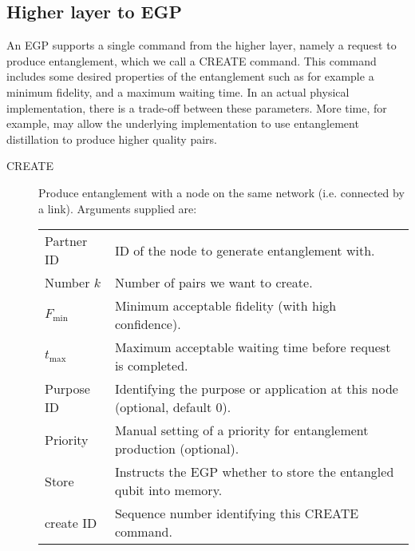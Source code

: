 \documentclass{article}
\begin{document}
\subsection{Higher layer to EGP}
An EGP supports a single command from the higher layer, namely a request to produce entanglement, which we call a CREATE command.
This command includes some desired properties of the entanglement such as for example a minimum fidelity, and a maximum waiting time.
In an actual physical implementation, there is a trade-off between these parameters. More time, for example, may allow the underlying
implementation to use entanglement distillation to produce higher quality pairs.
\begin{description}
\item[CREATE] Produce entanglement with a node on the same network (i.e. connected by a link). Arguments supplied are:\\
\noindent
\begin{tabular}{ll}
Partner ID & ID of the node to generate entanglement with. \\
Number $k$ & Number of pairs we want to create.\\
$F_{\min}$ & Minimum acceptable fidelity (with high confidence). \\
$t_{\max}$ & Maximum acceptable waiting time before request is completed. \\
Purpose ID & Identifying the purpose or application at this node (optional, default 0). \\
Priority & Manual setting of a priority for entanglement production (optional).\\
Store & Instructs the EGP whether to store the entangled qubit into memory. \\
create ID & Sequence number identifying this CREATE command.
\end{tabular}
\end{description}
\end{document}

